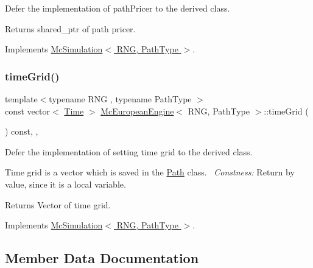 Defer the implementation of path\+Pricer to the derived class. 

\begin{DoxyReturn}{Returns}
shared\+\_\+ptr of path pricer. 
\end{DoxyReturn}


Implements \hyperlink{class_mc_simulation_a4d755ea777c2f3a2ec2fcc70acf71a6d}{Mc\+Simulation$<$ R\+N\+G, Path\+Type $>$}.

\hypertarget{class_mc_european_engine_ae4e0ab6834416144221f1a91dd154587}{}\label{class_mc_european_engine_ae4e0ab6834416144221f1a91dd154587} 
\subsubsection{\texorpdfstring{time\+Grid()}{timeGrid()}}
{\footnotesize\ttfamily template$<$typename R\+NG , typename Path\+Type $>$ \\
const vector$<$ \hyperlink{_name_def_8h_ac2d3e0ba793497bcca555c7c2cf64ff3}{Time} $>$ \hyperlink{class_mc_european_engine}{Mc\+European\+Engine}$<$ R\+NG, Path\+Type $>$\+::time\+Grid (\begin{DoxyParamCaption}{ }\end{DoxyParamCaption}) const\hspace{0.3cm}{\ttfamily [override]}, {\ttfamily [private]}, {\ttfamily [virtual]}}



Defer the implementation of setting time grid to the derived class. 

Time grid is a vector which is saved in the \hyperlink{class_path}{Path} class.~\newline
{\itshape Constness\+:} Return by value, since it is a local variable. \begin{DoxyReturn}{Returns}
Vector of time grid. 
\end{DoxyReturn}


Implements \hyperlink{class_mc_simulation_acf7d24981be3025a2cf07f8623dbe8ce}{Mc\+Simulation$<$ R\+N\+G, Path\+Type $>$}.



\subsection{Member Data Documentation}
\hypertarget{class_mc_european_engine_a25c0f328428ef5d24fef469e8861cca7}{}\label{class_mc_european_engine_a25c0f328428ef5d24fef469e8861cca7} 
